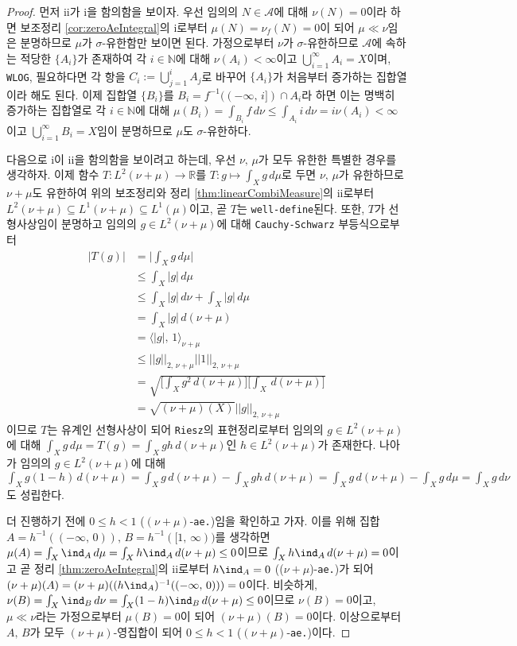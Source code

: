 \begin{proof}
    먼저 ii가 i을 함의함을 보이자. 우선 임의의 $N\in\mathcal{A}$에 대해 $\nu(N)=0$이라 하면 보조정리 \ref{cor:zeroAeIntegral}의 i로부터 $\mu(N)=\nu_f(N)=0$이 되어 $\mu\ll\nu$임은 분명하므로 $\mu$가 $\sigma$-유한함만 보이면 된다. 가정으로부터 $\nu$가 $\sigma$-유한하므로 $\mathcal{A}$에 속하는 적당한 $\{A_i\}$가 존재하여 각 $i\in\mathbb{N}$에 대해 $\nu(A_i)<\infty$이고 $\bigcup_{i=1}^\infty A_i=X$이며, \texttt{WLOG}, 필요하다면 각 항을 $C_i:=\bigcup_{j=1}^iA_j$로 바꾸어 $\{A_i\}$가 처음부터 증가하는 집합열이라 해도 된다. 이제 집합열 $\{B_i\}$를 $B_i=f^{-1}((-\infty,\,i])\cap A_i$라 하면 이는 명백히 증가하는 집합열로 각 $i\in\mathbb{N}$에 대해 $\mu(B_i)=\int_{B_i}f\,d\nu\leq\int_{A_i}i\,d\nu=i\nu(A_i)<\infty$이고 $\bigcup_{i=1}^\infty B_i=X$임이 분명하므로 $\mu$도 $\sigma$-유한하다.

    다음으로 i이 ii을 함의함을 보이려고 하는데, 우선 $\nu,\,\mu$가 모두 유한한 특별한 경우를 생각하자. 이제 함수 $T:L^2(\nu+\mu)\to\mathbb{R}$를 $T:g\mapsto\int_Xg\,d\mu$로 두면 $\nu,\,\mu$가 유한하므로 $\nu+\mu$도 유한하여 위의 보조정리와 정리 \ref{thm:linearCombiMeasure}의 ii로부터 $L^2(\nu+\mu)\subseteq L^1(\nu+\mu)\subseteq L^1(\mu)$이고, 곧 $T$는 \texttt{well-define}된다. 또한, $T$가 선형사상임이 분명하고 임의의 $g\in L^2(\nu+\mu)$에 대해 \texttt{Cauchy-Schwarz} 부등식으로부터
    \begin{align*}
        |T(g)|&=\bigg|\int_Xg\,d\mu\bigg|\\
        &\leq\int_X|g|\,d\mu\\
        &\leq\int_X|g|\,d\nu+\int_X|g|\,d\mu\\
        &=\int_X|g|\,d(\nu+\mu)\\
        &=\langle|g|,\,1\rangle_{\nu+\mu}\\
        &\leq||g||_{2,\,\nu+\mu}||1||_{2,\,\nu+\mu}\\
        &=\sqrt{\bigg[\int_Xg^2\,d(\nu+\mu)\bigg]\bigg[\int_X\,d(\nu+\mu)\bigg]}\\
        &=\sqrt{(\nu+\mu)(X)}||g||_{2,\,\nu+\mu}
    \end{align*}
    이므로 $T$는 유계인 선형사상이 되어 \texttt{Riesz}의 표현정리로부터 임의의 $g\in L^2(\nu+\mu)$에 대해 $\int_Xg\,d\mu=T(g)=\int_Xgh\,d(\nu+\mu)$인 $h\in L^2(\nu+\mu)$가 존재한다. 나아가 임의의 $g\in L^2(\nu+\mu)$에 대해 $\int_Xg(1-h)\,d(\nu+\mu)=\int_Xg\,d(\nu+\mu)-\int_Xgh\,d(\nu+\mu)=\int_Xg\,d(\nu+\mu)-\int_Xg\,d\mu=\int_Xg\,d\nu$도 성립한다.

    더 진행하기 전에 $0\leq h<1$ ($(\nu+\mu)$-\texttt{ae.})임을 확인하고 가자. 이를 위해 집합 $A=h^{-1}((-\infty,\,0)),\,B=h^{-1}([1,\,\infty))$를 생각하면 $\mu(A)=\int_X\ind_A\,d\mu=\int_Xh\ind_A\,d(\nu+\mu)\leq0$이므로 $\int_Xh\ind_A\,d(\nu+\mu)=0$이고 곧 정리 \ref{thm:zeroAeIntegral}의 ii로부터 $h\ind_A=0$ (($\nu+\mu$)-\texttt{ae.})가 되어 $(\nu+\mu)(A)=(\nu+\mu)((h\ind_A)^{-1}((-\infty,\,0)))=0$이다. 비슷하게, $\nu(B)=\int_X\ind_B\,d\nu=\int_X(1-h)\ind_B\,d(\nu+\mu)\leq0$이므로 $\nu(B)=0$이고, $\mu\ll\nu$라는 가정으로부터 $\mu(B)=0$이 되어 $(\nu+\mu)(B)=0$이다. 이상으로부터 $A,\,B$가 모두 $(\nu+\mu)$-영집합이 되어 $0\leq h<1$ ($(\nu+\mu)$-\texttt{ae.})이다.


\end{proof}
